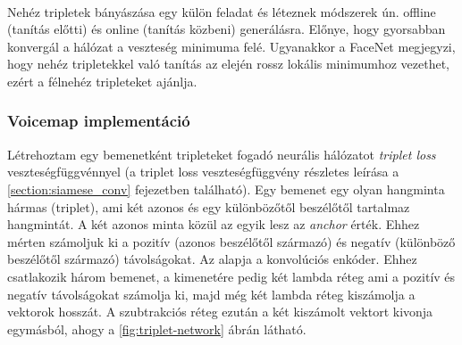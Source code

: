 \ \\
Nehéz tripletek bányászása egy külön feladat és léteznek módszerek ún. offline (tanítás előtti) és online (tanítás közbeni) generálásra. Előnye, hogy gyorsabban konvergál a hálózat a veszteség minimuma felé. Ugyanakkor a FaceNet megjegyzi, hogy nehéz tripletekkel való tanítás az elején rossz lokális minimumhoz vezethet, ezért a félnehéz tripleteket ajánlja.

\subsubsection{Voicemap implementáció}

Létrehoztam egy bemenetként tripleteket fogadó neurális hálózatot \emph{triplet loss} veszteségfüggvénnyel (a triplet loss veszteségfüggvény részletes leírása a \ref{section:siamese_conv} fejezetben található). Egy bemenet egy olyan hangminta hármas (triplet), ami két azonos és egy különbözőtől beszélőtől tartalmaz hangmintát. 
\newline
\newline
A két azonos minta közül az egyik lesz az \emph{anchor} érték. Ehhez mérten számoljuk ki a pozitív (azonos beszélőtől származó) és negatív (különböző beszélőtől származó) távolságokat. 
\newline
\newline
Az alapja a konvolúciós enkóder. Ehhez csatlakozik három bemenet, a kimenetére pedig két lambda réteg ami a pozitív és negatív távolságokat számolja ki, majd még két lambda réteg kiszámolja a vektorok hosszát. A szubtrakciós réteg ezután a két kiszámolt vektort kivonja egymásból, ahogy a \ref{fig:triplet-network} ábrán látható.

